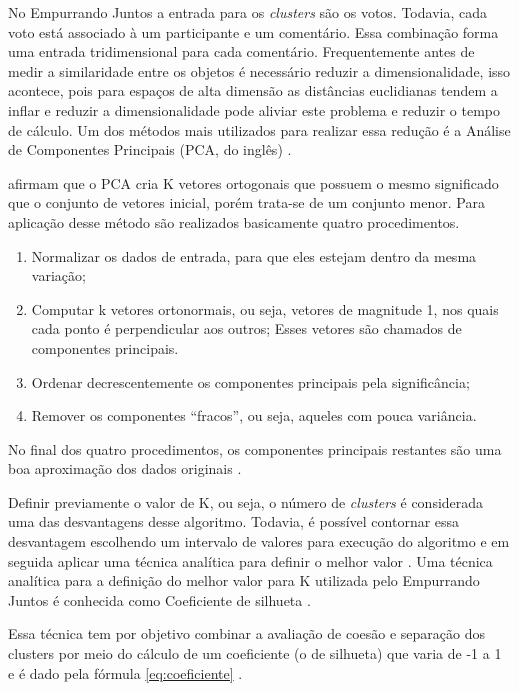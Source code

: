No Empurrando Juntos a entrada para os \textit{clusters} são os votos. Todavia, cada voto está associado à um participante e um 
comentário. Essa combinação forma uma entrada tridimensional para cada comentário.
Frequentemente antes de medir a similaridade entre os objetos é necessário
reduzir a dimensionalidade, isso acontece, pois para espaços de alta dimensão as distâncias euclidianas
tendem a inflar e reduzir a dimensionalidade pode aliviar este problema e reduzir o tempo de cálculo.
Um dos métodos mais utilizados para realizar essa redução é a Análise de 
Componentes Principais (PCA, do inglês) \cite{han2011data, sklearn}.


 afirmam que o PCA cria K vetores ortogonais que possuem o mesmo significado que o conjunto
de vetores inicial, porém trata-se de um conjunto menor. Para aplicação desse método são realizados basicamente quatro procedimentos.

\begin{enumerate}
 \item Normalizar os dados de entrada, para que eles estejam dentro da mesma variação;
 \item Computar k vetores ortonormais, ou seja, vetores de magnitude 1, nos quais cada ponto é perpendicular aos outros;
  \subitem Esses vetores são chamados de componentes principais.
 \item Ordenar decrescentemente os componentes principais pela significância;
 \item Remover os componentes ``fracos'', ou seja, aqueles com pouca variância.
\end{enumerate}

No final dos quatro procedimentos, os componentes principais restantes são uma boa aproximação dos dados originais \cite{han2011data}.

Definir previamente o valor de K, ou seja, o número de \textit{clusters} é considerada uma das desvantagens desse algoritmo. Todavia,
é possível contornar essa desvantagem escolhendo um intervalo de valores para execução do algoritmo e em seguida aplicar
uma técnica analítica para definir o melhor valor \cite{han2011data}. Uma técnica analítica para a definição do melhor valor para K utilizada pelo Empurrando Juntos
é conhecida como Coeficiente de silhueta \cite{sklearn}.

Essa técnica tem por objetivo combinar a avaliação de coesão e separação dos clusters por meio do cálculo de um coeficiente (o de silhueta) que 
varia de -1 a 1 e é dado pela fórmula \ref{eq:coeficiente} \cite{tan2013data}.

